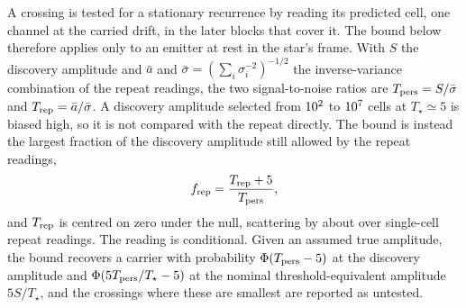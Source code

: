A crossing is tested for a stationary recurrence by reading its predicted
cell, one channel at the carried drift, in the later blocks that cover it.
The bound below therefore applies only to an emitter at rest in the star's
frame. With $S$
the discovery amplitude and $\bar{a}$ and $\bar{\sigma}=(\sum_i
\sigma_i^{-2})^{-1/2}$ the inverse-variance combination of the repeat
readings, the two signal-to-noise ratios are $T_{\rm pers}=S/\bar{\sigma}$
and $T_{\rm rep}=\bar{a}/\bar{\sigma}$. A discovery amplitude selected from
$10^{2}$ to $10^{7}$ cells at $T_\star\simeq5$ is
biased high, so it is not compared with the repeat directly. The bound is
instead the largest fraction of the discovery amplitude still allowed by the
repeat readings,
\begin{equation*}
f_{\rm rep}=\frac{T_{\rm rep}+5}{T_{\rm pers}},
\end{equation*}
and $T_{\rm rep}$ is centred on zero under the null, scattering by
\NuNullSd{} about \NuNullMean{} over \NuNullN{} single-cell repeat readings.
The reading is conditional. Given an assumed true amplitude, the bound
recovers a carrier with probability $\Phi(T_{\rm pers}-5)$ at the discovery
amplitude and $\Phi(5T_{\rm pers}/T_\star-5)$ at the nominal
threshold-equivalent amplitude $5S/T_\star$, and the \HjNPowerLo{} crossings
where these are smallest are reported as untested.
